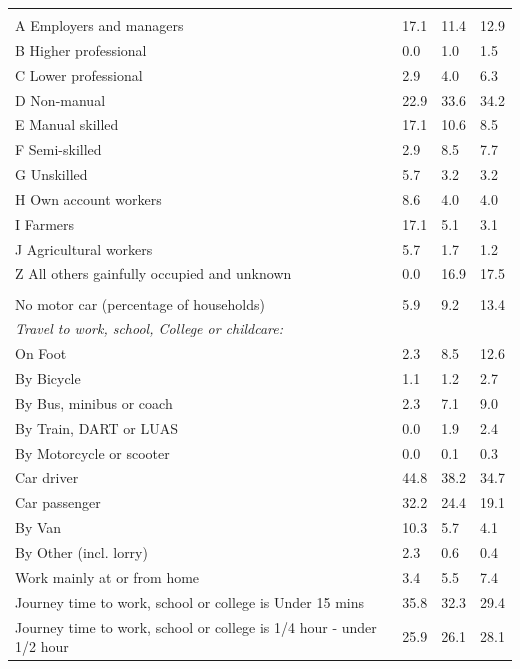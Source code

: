 \documentclass{article}
\begin{document}
\begin{table}[h]
\begin{tabular}{KTTT}
\hline
    \\ 
    \hline
A Employers and managers & 17.1& 11.4& 12.9\\
B Higher professional & 0.0& 1.0& 1.5\\
C Lower professional & 2.9& 4.0& 6.3\\
D Non-manual & 22.9& 33.6& 34.2\\
E Manual skilled & 17.1& 10.6&  8.5\\
F Semi-skilled & 2.9& 8.5& 7.7\\
G Unskilled & 5.7& 3.2& 3.2\\
H Own account workers & 8.6& 4.0& 4.0\\
I Farmers & 17.1&  5.1&  3.1\\
J Agricultural workers & 5.7& 1.7& 1.2\\
Z All others gainfully occupied and unknown &  0.0& 16.9& 17.5\\
\hline
{}\hline
    \\ 
    \hline
No motor car (percentage of households) &  5.9&  9.2& 
13.4\\
    \hline
\emph{Travel to work, school, College or childcare:} & & & \\
\quad On Foot &  2.3&  8.5& 12.6\\
\quad By Bicycle & 1.1& 1.2& 2.7\\
\quad By Bus, minibus or coach & 2.3& 7.1& 9.0\\
\quad By Train, DART or LUAS & 0.0& 1.9& 2.4\\
\quad By Motorcycle or scooter & 0.0& 0.1& 0.3\\
\quad Car driver & 44.8& 38.2& 34.7\\
\quad Car passenger & 32.2& 24.4& 19.1\\
\quad By Van & 10.3&  5.7&  4.1\\
\quad By Other (incl. lorry) & 2.3& 0.6& 0.4\\
    \hline
Work mainly at or from home & 3.4& 5.5& 7.4\\
Journey time to work, school or college is Under 15 mins & 35.8& 32.3& 29.4\\
Journey time to work, school or college is 1/4 hour - under 1/2 hour & 25.9& 26.1& 28.1\\

\end{tabular}
\end{table}
\end{document}
